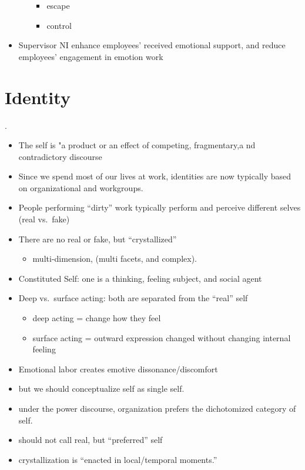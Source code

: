 \documentclass[
]{book}
\providecommand{\tightlist}{%
  \setlength{\itemsep}{0pt}\setlength{\parskip}{0pt}}
\begin{document}
\begin{itemize}
\begin{itemize}
    \begin{itemize}
    \item
      escape
    \item
      control
    \end{itemize}
  \end{itemize}
\item
  Supervisor NI enhance employees' received emotional support, and
  reduce employees' engagement in emotion work
\end{itemize}

\hypertarget{identity}{%
\chapter{Identity}\label{identity}}

\citep{Tracy_2005}.

\begin{itemize}
\item
  The self is "a product or an effect of competing, fragmentary,a nd
  contradictory discourse \citep{Tracy_2005}
\item
  Since we spend most of our lives at work, identities are now
  typically based on organizational and workgroups.
\item
  People performing ``dirty'' work typically perform and perceive
  different selves (real vs.~fake)
\item
  There are no real or fake, but ``crystallized''

  \begin{itemize}
  \tightlist
  \item
    multi-dimension, (multi facets, and complex).
  \end{itemize}
\item
  Constituted Self: one is a thinking, feeling subject, and social
  agent
\item
  Deep vs.~surface acting: both are separated from the ``real'' self

  \begin{itemize}
  \item
    deep acting = change how they feel
  \item
    surface acting = outward expression changed without changing
    internal feeling
  \end{itemize}
\item
  Emotional labor creates emotive dissonance/discomfort
\item
  but we should conceptualize self as single self.
\item
  under the power discourse, organization prefers the dichotomized
  category of self.
\item
  should not call real, but ``preferred'' self
\item
  crystallization is ``enacted in local/temporal moments.''
\end{itemize}
\end{document}
